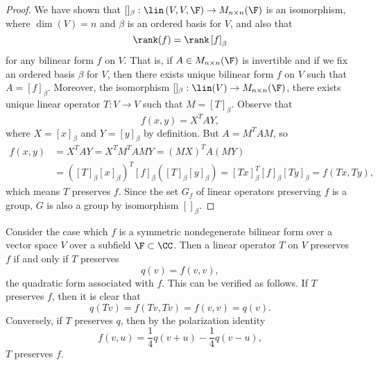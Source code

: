 \documentclass[linearalgebra]{subfiles}
\begin{document}
    \begin{proof}
        We have shown that $[]_\beta:\lin\left( V,V,\F \right) \to M_{n\times n}(\F)$ is an isomorphism, where $\dim(V)=n$ and $\beta$ is an ordered basis for $V$, and also that
        \begin{equation*}
            \rank(f) = \rank\left[ f \right] _\beta
        \end{equation*}
        for any bilinear form $f$ on $V$. That is, if $A\in M_{n\times n}(\F)$ is invertible and if we fix an ordered basis $\beta$ for $V$, then there exists unique bilinear form $f$ on $V$ such that $A = \left[ f \right] _\beta$. Moreover, the isomorphism $[]_\beta: \lin(V)\to M_{n\times n}(\F)$, there exists unique linear operator $T:V\to V$ such that $M=\left[ T \right] _\beta$. Observe that
        \begin{equation*}
            f\left( x,y \right) = X^TAY,
        \end{equation*}
        where $X=\left[ x \right] _\beta$ and $Y=\left[ y \right] _\beta$ by definition. But $A=M^TAM$, so
        \begin{align*}
            f\left( x,y \right) & = X^TAY = X^TM^TAMY = \left( MX \right) ^TA\left( MY \right) \\ 
                                & = \left( \left[ T \right] _\beta\left[ x \right] _\beta \right) ^T \left[ f \right] _\beta\left( \left[ T \right] _\beta\left[ y \right] _\beta \right) = \left[ Tx \right] _\beta^T\left[ f \right] _\beta\left[ Ty \right] _\beta = f\left( Tx,Ty \right) ,
        \end{align*} 
        which means $T$ preserves $f$. Since the set $G_f$ of linear operators preserving $f$ is a group, $G$ is also a group by isomorphism $[]_\beta$. 
    \end{proof}

    \begin{remark}
        Consider the case which $f$ is a symmetric nondegenerate bilinear form over a vector space $V$ over a subfield $\F\subset\CC$. Then a linear operator $T$ on $V$ preserves $f$ if and only if $T$ preserves 
        \begin{equation*}
            q(v) = f(v,v),
        \end{equation*}
        the quadratic form associated with $f$. This can be verified as follows. If $T$ preserves $f$, then it is clear that
        \begin{equation*}
            q\left( Tv \right) = f\left( Tv,Tv \right) = f\left( v,v \right) = q\left( v \right) .
        \end{equation*}
        Conversely, if $T$ preserves $q$, then by the polarization identity
        \begin{equation*}
            f\left( v,u \right) = \frac{1}{4}q\left( v+u \right) - \frac{1}{4}q\left( v-u \right) , 
        \end{equation*}
        $T$ preserves $f$.
    \end{remark}
    
    
    

    
\end{document}
